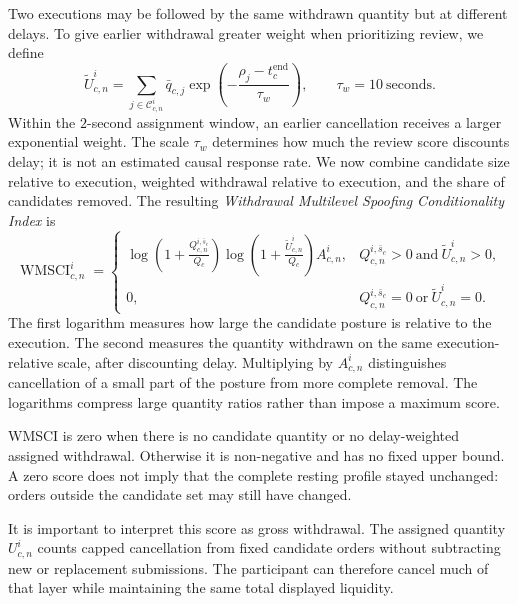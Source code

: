 \documentclass[11pt]{article}
\begin{document}
Two executions may be followed by the same withdrawn quantity but at different delays. To give earlier withdrawal
greater weight when prioritizing review, we define
\begin{equation}
    \widetilde U^{i}_{c,n}
    =
    \sum_{j\in\mathcal{C}_{c,n}^{i}}
    \bar q_{c,j}\exp\!\left(-\frac{\rho_j-t_c^{\mathrm{end}}}{\tau_w}\right),
    \qquad \tau_w=10\ \text{seconds}.
    \label{eq:delay_weighted_withdrawal}
\end{equation}
Within the $2$-second assignment window, an earlier cancellation receives a larger exponential weight. The scale $\tau_w$ determines how much the review score discounts delay; it is not an estimated causal response rate. We now combine candidate size relative to execution, weighted withdrawal relative to execution, and the share of candidates removed. The resulting \textit{Withdrawal Multilevel Spoofing Conditionality Index} is
\begin{equation}
    \operatorname{WMSCI}^{i}_{c,n}
    =
    \begin{cases}
    \displaystyle
    \log\!\left(1+\frac{Q^{i,\bar{s}_c}_{c,n}}{Q_c}\right)
    \log\!\left(1+\frac{\widetilde U^{i}_{c,n}}{Q_c}\right)
    A^{i}_{c,n},
    & Q^{i,\bar{s}_c}_{c,n}>0\ \text{and}\ \widetilde U^{i}_{c,n}>0,\\[5pt]
    0,
    & Q^{i,\bar{s}_c}_{c,n}=0\ \text{or}\ \widetilde U^{i}_{c,n}=0.
    \end{cases}
    \label{eq:wmsci}
\end{equation}
The first logarithm measures how large the candidate posture is relative to the execution. The second measures the quantity withdrawn on the same execution-relative scale, after discounting delay. Multiplying by $A^{i}_{c,n}$ distinguishes cancellation of a small part of the posture from more complete removal. The logarithms compress large quantity ratios rather than impose a maximum score.

WMSCI is zero when there is no candidate quantity or no delay-weighted assigned withdrawal. Otherwise it is non-negative and has no fixed upper bound. A zero score does not imply that the complete resting profile stayed unchanged: orders outside the candidate set may still have changed.

It is important to interpret this score as gross withdrawal. The assigned quantity $U^{i}_{c,n}$ counts capped cancellation from fixed candidate orders without subtracting new or replacement submissions. The participant can therefore cancel much of that layer while maintaining the same total displayed liquidity.
\end{document}

